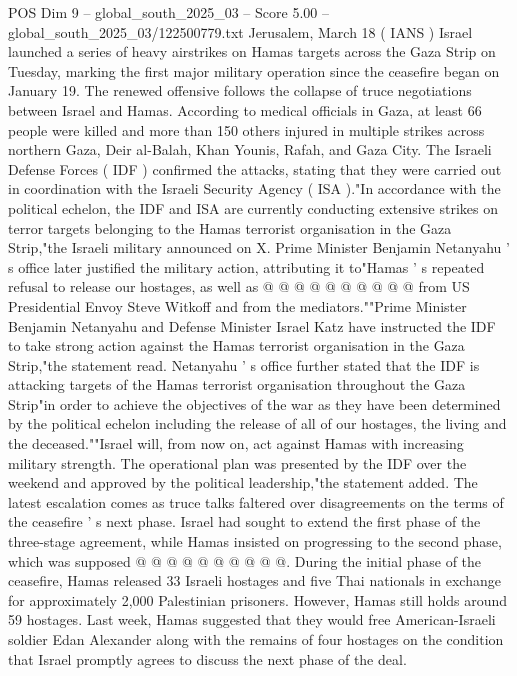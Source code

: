 \begin{textsample}{POS Dim 9 – global\_south\_2025\_03 – Score 5.00 – global\_south\_2025\_03/122500779.txt}  \label{ex:f9_pos_137}
Jerusalem, March 18 ( IANS ) Israel launched a series of heavy airstrikes on Hamas targets across the Gaza Strip on Tuesday, marking the first major military operation since the ceasefire began on January 19.
The renewed offensive follows the collapse of truce negotiations between Israel and Hamas.
According to medical officials in Gaza, at least 66 people were killed and more than 150 others injured in multiple strikes across northern Gaza, Deir al-Balah, Khan Younis, Rafah, and Gaza City.
The Israeli Defense Forces ( IDF ) confirmed the attacks, stating that they were carried out in coordination with the Israeli Security Agency ( ISA )."In accordance with the political echelon, the IDF and ISA are currently conducting extensive strikes on terror targets belonging to the Hamas terrorist organisation in the Gaza Strip,"the Israeli military announced on X.
Prime Minister Benjamin Netanyahu ' s office later justified the military action, attributing it to"Hamas ' s repeated refusal to release our hostages, as well as @ @ @ @ @ @ @ @ @ @ from US Presidential Envoy Steve Witkoff and from the mediators.""Prime Minister Benjamin Netanyahu and Defense Minister Israel Katz have instructed the IDF to take strong action against the Hamas terrorist organisation in the Gaza Strip,"the statement read.
Netanyahu ' s office further stated that the IDF is attacking targets of the Hamas terrorist organisation throughout the Gaza Strip"in order to achieve the objectives of the war as they have been determined by the political echelon including the release of all of our hostages, the living and the deceased.""Israel will, from now on, act against Hamas with increasing military strength.
The operational plan was presented by the IDF over the weekend and approved by the political leadership,"the statement added.
The latest escalation comes as truce talks faltered over disagreements on the terms of the ceasefire ' s next phase.
Israel had sought to extend the first phase of the three-stage agreement, while Hamas insisted on progressing to the second phase, which was supposed @ @ @ @ @ @ @ @ @ @.
During the initial phase of the ceasefire, Hamas released 33 Israeli hostages and five Thai nationals in exchange for approximately 2,000 Palestinian prisoners.
However, Hamas still holds around 59 hostages.
Last week, Hamas suggested that they would free American-Israeli soldier Edan Alexander along with the remains of four hostages on the condition that Israel promptly agrees to discuss the next phase of the deal.

\end{textsample}
